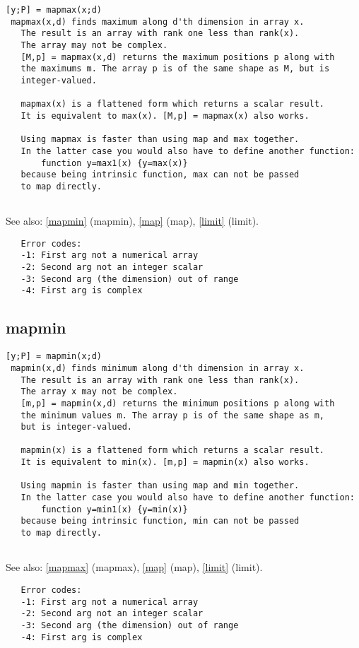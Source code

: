 \documentclass[a4paper]{article}
\begin{document}
\begin{tscreen}
\begin{verbatim}
[y;P] = mapmax(x;d)
 mapmax(x,d) finds maximum along d'th dimension in array x.
   The result is an array with rank one less than rank(x).
   The array may not be complex.
   [M,p] = mapmax(x,d) returns the maximum positions p along with
   the maximums m. The array p is of the same shape as M, but is
   integer-valued.

   mapmax(x) is a flattened form which returns a scalar result.
   It is equivalent to max(x). [M,p] = mapmax(x) also works.

   Using mapmax is faster than using map and max together.
   In the latter case you would also have to define another function:
       function y=max1(x) {y=max(x)}
   because being intrinsic function, max can not be passed
   to map directly. 
   
\end{verbatim}

See also: \ref{mapmin} {(mapmin)}, \ref{map} {(map)}, \ref{limit} {(limit)}.
\begin{verbatim}
   Error codes:
   -1: First arg not a numerical array
   -2: Second arg not an integer scalar
   -3: Second arg (the dimension) out of range
   -4: First arg is complex 
\end{verbatim}
\end{tscreen}



\subsection{mapmin\label{mapmin}}

\begin{tscreen}
\begin{verbatim}
[y;P] = mapmin(x;d)
 mapmin(x,d) finds minimum along d'th dimension in array x.
   The result is an array with rank one less than rank(x).
   The array x may not be complex.
   [m,p] = mapmin(x,d) returns the minimum positions p along with
   the minimum values m. The array p is of the same shape as m,
   but is integer-valued.

   mapmin(x) is a flattened form which returns a scalar result.
   It is equivalent to min(x). [m,p] = mapmin(x) also works.

   Using mapmin is faster than using map and min together.
   In the latter case you would also have to define another function:
       function y=min1(x) {y=min(x)}
   because being intrinsic function, min can not be passed
   to map directly. 
   
\end{verbatim}

See also: \ref{mapmax} {(mapmax)}, \ref{map} {(map)}, \ref{limit} {(limit)}.
\begin{verbatim}
   Error codes:
   -1: First arg not a numerical array
   -2: Second arg not an integer scalar
   -3: Second arg (the dimension) out of range
   -4: First arg is complex 
\end{verbatim}
\end{tscreen}
\end{document}
